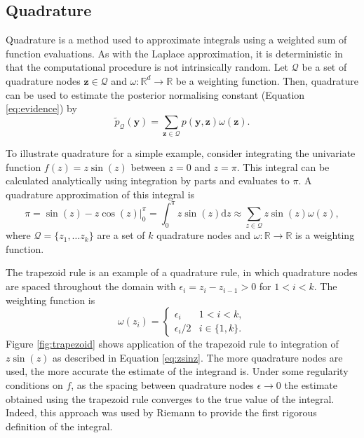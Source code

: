 \documentclass[a4paper, nobind]{templates/ociamthesis}
\begin{document}
\hypertarget{quadrature}{%
\subsection{Quadrature}\label{quadrature}}

Quadrature is a method used to approximate integrals using a weighted sum of function evaluations.
As with the Laplace approximation, it is deterministic in that the computational procedure is not intrinsically random.
Let \(\mathcal{Q}\) be a set of quadrature nodes \(\mathbf{z} \in \mathcal{Q}\) and \(\omega: \mathbb{R}^d \to \mathbb{R}\) be a weighting function.
Then, quadrature can be used to estimate the posterior normalising constant (Equation \eqref{eq:evidence}) by
\begin{equation}
\tilde p_{\mathcal{Q}}(\mathbf{y}) = \sum_{\mathbf{z} \in \mathcal{Q}} p(\mathbf{y}, \mathbf{z}) \omega(\mathbf{z}).
\end{equation}

To illustrate quadrature for a simple example, consider integrating the univariate function \(f(z) = z \sin(z)\) between \(z = 0\) and \(z = \pi\).
This integral can be calculated analytically using integration by parts and evaluates to \(\pi\).
A quadrature approximation of this integral is
\begin{equation}
\pi = \sin(z) - z \cos(z) \bigg|_0^\pi = \int_{0}^\pi z \sin(z) \text{d} z \approx \sum_{z \in \mathcal{Q}} z \sin(z) \omega(z), \label{eq:zsinz}
\end{equation}
where \(\mathcal{Q} = \{z_1, \ldots z_k\}\) are a set of \(k\) quadrature nodes and \(\omega: \mathbb{R} \to \mathbb{R}\) is a weighting function.

The trapezoid rule is an example of a quadrature rule, in which quadrature nodes are spaced throughout the domain with \(\epsilon_i = z_i - z_{i - 1} > 0\) for \(1 < i < k\).
The weighting function is
\begin{equation}
\omega(z_i) = 
\begin{cases}
  \epsilon_i & 1 < i < k, \\
  \epsilon_i / 2 & i \in \{1, k\}.
\end{cases}
\end{equation}
Figure \ref{fig:trapezoid} shows application of the trapezoid rule to integration of \(z \sin(z)\) as described in Equation \eqref{eq:zsinz}.
The more quadrature nodes are used, the more accurate the estimate of the integrand is.
Under some regularity conditions on \(f\), as the spacing between quadrature nodes \(\epsilon \to 0\) the estimate obtained using the trapezoid rule converges to the true value of the integral.
Indeed, this approach was used by Riemann to provide the first rigorous definition of the integral.
\end{document}
